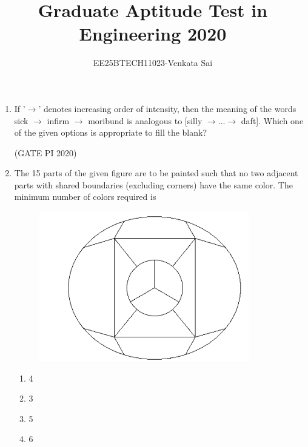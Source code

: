 \documentclass[journal,12pt,onecolumn]{IEEEtran}
\title{Graduate Aptitude Test in Engineering 2020}
\author{EE25BTECH11023-Venkata Sai}
\theoremstyle{remark}
\begin{document}
\noindent
\maketitle

\begin{enumerate}
\item If '$\rightarrow$' denotes increasing order of intensity, then the meaning of the words {sick $\rightarrow$ infirm $\rightarrow$ moribund} is analogous to [silly $\rightarrow \dots \rightarrow$ daft]. Which one of the given options is appropriate to fill the blank?
\begin{enumerate}
\end{enumerate}

\hfill (GATE PI 2020)

\item The 15 parts of the given figure are to be painted such that no two adjacent parts with shared boundaries (excluding corners) have the same color. The minimum number of colors required is

\begin{figure}[h]
    \centering
    \includegraphics[width=0.5\columnwidth]{figs/fig1.png}
    \caption{}
    \label{fig:placeholder}
\end{figure} 
\begin{multicols}{4}
\begin{enumerate}
    \item 4
    \item 3
    \item 5
    \item 6
\end{enumerate}
\end{multicols}


\end{enumerate}
\end{document}
